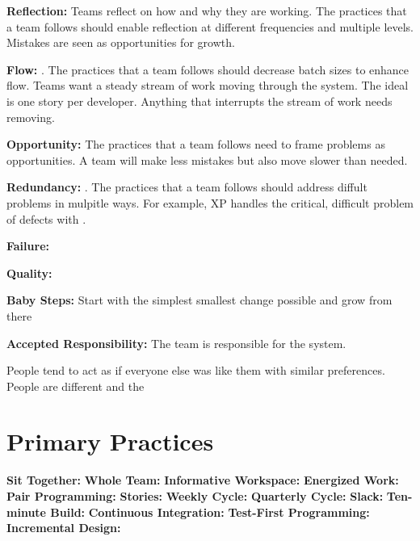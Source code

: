 \textbf{Reflection:} Teams reflect on how and why they are working. The practices that a team follows should enable reflection at different frequencies and multiple levels. Mistakes are seen as opportunities for growth.


\textbf{Flow:}   \cite{BeckExtremeProgramming2004}. The practices that a team follows should decrease batch sizes to enhance flow. Teams want a steady stream of work moving through the system. The ideal  is one story per developer. Anything that interrupts the stream of work needs removing. 


\textbf{Opportunity:} The practices that a team follows need to frame problems as opportunities. A team  will make less mistakes but also move slower than needed.


\textbf{Redundancy:}  \cite{BeckExtremeProgramming2004}. The practices that a team follows should address diffult problems in mulpitle ways. For example, XP handles the critical, difficult problem of defects with   \cite{BeckExtremeProgramming2004}. 




\textbf{Failure:}


\textbf{Quality:}




\textbf{Baby Steps:} Start with the simplest smallest change possible and grow from there


\textbf{Accepted Responsibility:} The team is responsible for the system. 




People tend to act as if everyone else was like them with similar preferences. People are different and the


\section{Primary Practices}
\textbf{Sit Together:}
\textbf{Whole Team:}
\textbf{Informative Workspace:}
\textbf{Energized Work:}
\textbf{Pair Programming:}
\textbf{Stories:}
\textbf{Weekly Cycle:}
\textbf{Quarterly Cycle:}
\textbf{Slack:}
\textbf{Ten-minute Build:}
\textbf{Continuous Integration:}
\textbf{Test-First Programming:}
\textbf{Incremental Design:}








